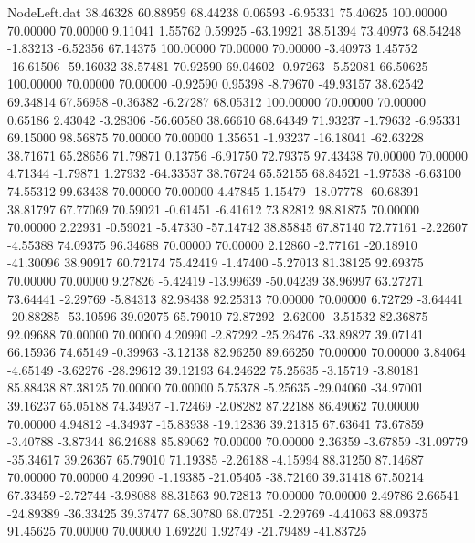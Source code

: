\begin{filecontents}{NodeLeft.dat}
  38.46328   60.88959   68.44238     0.06593   -6.95331   75.40625  100.00000   70.00000   70.00000    9.11041    1.55762    0.59925  -63.19921
  38.51394   73.40973   68.54248    -1.83213   -6.52356   67.14375  100.00000   70.00000   70.00000   -3.40973    1.45752  -16.61506  -59.16032
  38.57481   70.92590   69.04602    -0.97263   -5.52081   66.50625  100.00000   70.00000   70.00000   -0.92590    0.95398   -8.79670  -49.93157
  38.62542   69.34814   67.56958    -0.36382   -6.27287   68.05312  100.00000   70.00000   70.00000    0.65186    2.43042   -3.28306  -56.60580
  38.66610   68.64349   71.93237    -1.79632   -6.95331   69.15000   98.56875   70.00000   70.00000    1.35651   -1.93237  -16.18041  -62.63228
  38.71671   65.28656   71.79871     0.13756   -6.91750   72.79375   97.43438   70.00000   70.00000    4.71344   -1.79871    1.27932  -64.33537
  38.76724   65.52155   68.84521    -1.97538   -6.63100   74.55312   99.63438   70.00000   70.00000    4.47845    1.15479  -18.07778  -60.68391
  38.81797   67.77069   70.59021    -0.61451   -6.41612   73.82812   98.81875   70.00000   70.00000    2.22931   -0.59021   -5.47330  -57.14742
  38.85845   67.87140   72.77161    -2.22607   -4.55388   74.09375   96.34688   70.00000   70.00000    2.12860   -2.77161  -20.18910  -41.30096
  38.90917   60.72174   75.42419    -1.47400   -5.27013   81.38125   92.69375   70.00000   70.00000    9.27826   -5.42419  -13.99639  -50.04239
  38.96997   63.27271   73.64441    -2.29769   -5.84313   82.98438   92.25313   70.00000   70.00000    6.72729   -3.64441  -20.88285  -53.10596
  39.02075   65.79010   72.87292    -2.62000   -3.51532   82.36875   92.09688   70.00000   70.00000    4.20990   -2.87292  -25.26476  -33.89827
  39.07141   66.15936   74.65149    -0.39963   -3.12138   82.96250   89.66250   70.00000   70.00000    3.84064   -4.65149   -3.62276  -28.29612
  39.12193   64.24622   75.25635    -3.15719   -3.80181   85.88438   87.38125   70.00000   70.00000    5.75378   -5.25635  -29.04060  -34.97001
  39.16237   65.05188   74.34937    -1.72469   -2.08282   87.22188   86.49062   70.00000   70.00000    4.94812   -4.34937  -15.83938  -19.12836
  39.21315   67.63641   73.67859    -3.40788   -3.87344   86.24688   85.89062   70.00000   70.00000    2.36359   -3.67859  -31.09779  -35.34617
  39.26367   65.79010   71.19385    -2.26188   -4.15994   88.31250   87.14687   70.00000   70.00000    4.20990   -1.19385  -21.05405  -38.72160
  39.31418   67.50214   67.33459    -2.72744   -3.98088   88.31563   90.72813   70.00000   70.00000    2.49786    2.66541  -24.89389  -36.33425
  39.37477   68.30780   68.07251    -2.29769   -4.41063   88.09375   91.45625   70.00000   70.00000    1.69220    1.92749  -21.79489  -41.83725

\end{filecontents}
